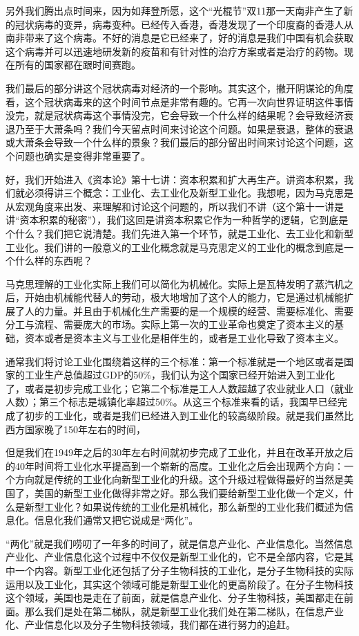 \documentclass[UTF8, 12pt, a4paper]{ctexrep}
\begin{document}
另外我们腾出点时间来，因为如拜登所愿，这个“光棍节”双11那一天南非产生了新的冠状病毒的变异，病毒变种。已经传入香港，香港发现了一个印度裔的香港人从南非带来了这个病毒。不好的消息是它已经来了，好的消息是我们中国有机会获取这个病毒并可以迅速地研发新的疫苗和有针对性的治疗方案或者是治疗的药物。现在所有的国家都在跟时间赛跑。

我们最后的部分讲这个冠状病毒对经济的一个影响。其实这个，撇开阴谋论的角度看，这个冠状病毒来的这个时间节点是非常有趣的。它再一次向世界证明这件事情没完，就是冠状病毒这个事情没完，它会导致一个什么样的结果呢？会导致经济衰退乃至于大萧条吗？我们今天留点时间来讨论这个问题。如果是衰退，整体的衰退或大萧条会导致一个什么样的景象？我们最后的部分留出时间来讨论这个问题，这个问题也确实是变得非常重要了。

好，我们开始进入《资本论》第十七讲：资本积累和扩大再生产。讲资本积累，我们就必须得讲三个概念：工业化、去工业化及新型工业化。我想呢，因为马克思是从宏观角度来出发、来理解和讨论这个问题的，所以我们不讲（这个第十一讲是讲“资本积累的秘密”），我们这回是讲资本积累它作为一种哲学的逻辑，它到底是个什么？我们把它说清楚。我们先进入第一个环节，就是工业化、去工业化和新型工业化。我们讲的一般意义的工业化概念就是马克思定义的工业化的概念到底是一个什么样的东西呢？

马克思理解的工业化实际上我们可以简化为机械化。实际上是瓦特发明了蒸汽机之后，开始由机械能代替人的劳动，极大地增加了这个人的能力，它是通过机械能扩展了人的力量。并且由于机械化生产需要的是一个规模的经营、需要标准化、需要分工与流程、需要庞大的市场。实际上第一次的工业革命也奠定了资本主义的基础，资本或者是资本主义与工业化是相伴生的，或者是工业化导致了资本主义。

通常我们将讨论工业化围绕着这样的三个标准：第一个标准就是一个地区或者是国家的工业生产总值超过GDP的50\%，我们认为这个国家已经开始进入到工业化了，或者是初步完成工业化；它第二个标准是工人人数超越了农业就业人口（就业人数）；第三个标志是城镇化率超过50\%。从这三个标准来看的话，我国早已经完成了初步的工业化，或者是我们已经进入到工业化的较高级阶段。就是我们虽然比西方国家晚了150年左右的时间，

但是我们在1949年之后的30年左右时间就初步完成了工业化，并且在改革开放之后的40年时间将工业化水平提高到一个崭新的高度。工业化之后会出现两个方向：一个方向就是传统的工业化向新型工业化的升级。这个升级过程做得最好的当然是美国了，美国的新型工业化做得非常之好。那么我们要给新型工业化做一个定义，什么是新型工业化？如果说传统的工业化是机械化，那么新型的工业化我们概述为信息化。信息化我们通常又把它说成是“两化”。

“两化”就是我们唠叨了一年多的时间了，就是信息产业化、产业信息化。当然信息产业化、产业信息化这个过程中不仅仅是新型工业化的，它不是全部内容，它是其中一个内容。新型工业化还包括了分子生物科技的工业化，是分子生物科技的实际运用以及工业化，其实这个领域可能是新型工业化的更高阶段了。在分子生物科技这个领域，美国也是走在了前面，就是信息产业化、分子生物科技，美国都走在前面。那么我们是处在第二梯队，就是新型工业化我们处在第二梯队，在信息产业化、产业信息化以及分子生物科技领域，我们都在进行努力的追赶。
\end{document}
